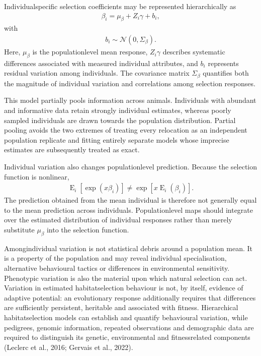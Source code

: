 \documentclass[letterpaper,10pt,english]{sphinxmanual}
\begin{document}
\sphinxAtStartPar
Individual\sphinxhyphen{}specific selection coefficients may be represented hierarchically as
\begin{equation*}
\begin{split}
\beta_i
=
\mu_{\beta}
+
Z_i\gamma
+
b_i,
\end{split}
\end{equation*}
\sphinxAtStartPar
with
\begin{equation*}
\begin{split}
b_i
\sim
\mathcal{N}
\left(
0,\Sigma_{\beta}
\right).
\end{split}
\end{equation*}
\sphinxAtStartPar
Here, \(\mu_{\beta}\) is the population\sphinxhyphen{}level mean response, \(Z_i\gamma\) describes systematic differences associated with measured individual attributes, and \(b_i\) represents residual variation among individuals. The covariance matrix \(\Sigma_{\beta}\) quantifies both the magnitude of individual variation and correlations among selection responses.

\sphinxAtStartPar
This model partially pools information across animals. Individuals with abundant and informative data retain strongly individual estimates, whereas poorly sampled individuals are drawn towards the population distribution. Partial pooling avoids the two extremes of treating every relocation as an independent population replicate and fitting entirely separate models whose imprecise estimates are subsequently treated as exact.

\sphinxAtStartPar
Individual variation also changes population\sphinxhyphen{}level prediction. Because the selection function is nonlinear,
\begin{equation*}
\begin{split}
\operatorname{E}_i
\left[
\exp(x\beta_i)
\right]
\neq
\exp
\left[
x\operatorname{E}_i(\beta_i)
\right].
\end{split}
\end{equation*}
\sphinxAtStartPar
The prediction obtained from the mean individual is therefore not generally equal to the mean prediction across individuals. Population\sphinxhyphen{}level maps should integrate over the estimated distribution of individual responses rather than merely substitute \(\mu_{\beta}\) into the selection function.

\sphinxAtStartPar
Among\sphinxhyphen{}individual variation is not statistical debris around a population mean. It is a property of the population and may reveal individual specialisation, alternative behavioural tactics or differences in environmental sensitivity. Phenotypic variation is also the material upon which natural selection can act. Variation in estimated habitat\sphinxhyphen{}selection behaviour is not, by itself, evidence of adaptive potential: an evolutionary response additionally requires that differences are sufficiently persistent, heritable and associated with fitness. Hierarchical habitat\sphinxhyphen{}selection models can establish and quantify behavioural variation, while pedigrees, genomic information, repeated observations and demographic data are required to distinguish its genetic, environmental and fitness\sphinxhyphen{}related components (Leclerc et al., 2016; Gervais et al., 2022).
\end{document}
